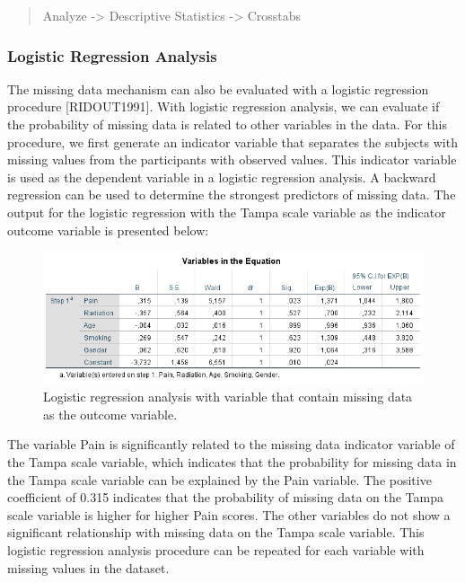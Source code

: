 \documentclass[]{book}
\begin{document}
\begin{quote}
Analyze -\textgreater{} Descriptive Statistics -\textgreater{} Crosstabs
\end{quote}

\subsubsection{Logistic Regression
Analysis}\label{logistic-regression-analysis}

The missing data mechanism can also be evaluated with a logistic
regression procedure {[}RIDOUT1991{]}. With logistic regression
analysis, we can evaluate if the probability of missing data is related
to other variables in the data. For this procedure, we first generate an
indicator variable that separates the subjects with missing values from
the participants with observed values. This indicator variable is used
as the dependent variable in a logistic regression analysis. A backward
regression can be used to determine the strongest predictors of missing
data. The output for the logistic regression with the Tampa scale
variable as the indicator outcome variable is presented below:

\begin{figure}

{\centering \includegraphics[width=0.9\linewidth]{images/tab2.6} 

}

\caption{Logistic regression analysis with variable that contain missing data as the outcome variable.}\label{fig:tab2-6}
\end{figure}

The variable Pain is significantly related to the missing data indicator
variable of the Tampa scale variable, which indicates that the
probability for missing data in the Tampa scale variable can be
explained by the Pain variable. The positive coefficient of 0.315
indicates that the probability of missing data on the Tampa scale
variable is higher for higher Pain scores. The other variables do not
show a significant relationship with missing data on the Tampa scale
variable. This logistic regression analysis procedure can be repeated
for each variable with missing values in the dataset.
\end{document}
